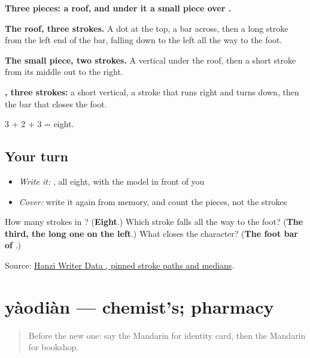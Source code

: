 \begin{quote}
\end{quote}

\textbf{Three pieces: a roof, and under it a small piece over .}

\textbf{The roof, three strokes.} A dot at the top, a bar across, then a long stroke from the left end of the bar, falling down to the left all the way to the foot.

\textbf{The small piece, two strokes.} A vertical under the roof, then a short stroke from its middle out to the right.

\textbf{, three strokes:} a short vertical, a stroke that runs right and turns down, then the bar that closes the foot.

3 + 2 + 3 = eight.

\subsection*{Your turn}
\begin{itemize}
\raggedright
  \item \emph{Write it:} , all eight, with the model in front of you
  \item \emph{Cover:} write it again from memory, and count the pieces, not the strokes
\end{itemize}

\begin{tcolorbox}[breakable,colback=teal!4,colframe=teal!35!black,title={Before you move on}]
How many strokes in ? (\textbf{Eight}.) Which stroke falls all the way to the foot? (\textbf{The third, the long one on the left}.) What closes the character? (\textbf{The foot bar of }.)

Source: \href{https://raw.githubusercontent.com/chanind/hanzi-writer-data/68d10a4b21150cae5e1ebbd223eed289cf32d90c/data/\%E5\%BA\%97.json}{Hanzi Writer Data , pinned stroke paths and medians}.
\end{tcolorbox}
\section[yàodiàn]{yàodiàn — chemist's; pharmacy}

\label{lesson:ZH-C190-yaodian}



\begin{quote}
Before the new one: say the Mandarin for identity card, then the Mandarin for bookshop.
\end{quote}

